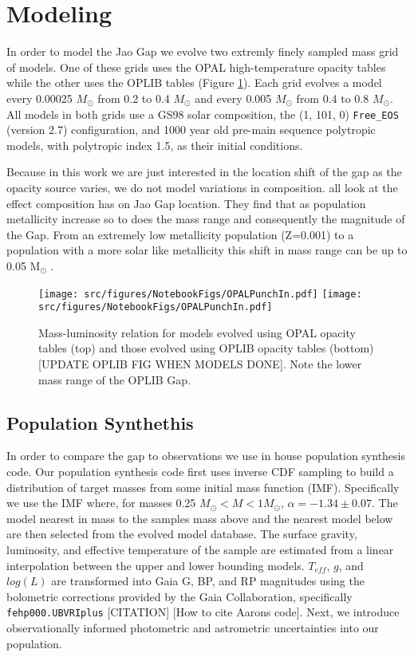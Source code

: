 \section{Modeling}\label{sec:modeling}
In order to model the Jao Gap we evolve two extremly finely sampled mass grid
of models. One of these grids uses the OPAL high-temperature opacity tables
while the other uses the OPLIB tables (Figure \ref{fig:PunchIn}). Each grid
evolves a model every 0.00025 $M_{\odot}$ from 0.2 to 0.4 $M_{\odot}$ and every
0.005 $M_{\odot}$ from 0.4 to 0.8 $M_{\odot}$. All models in both grids use a
GS98 solar composition, the (1, 101, 0) \texttt{Free\_EOS} (version
{\color{red}2.7}) configuration, and 1000 year old pre-main sequence polytropic
models, with polytropic index 1.5, as their initial conditions.

Because in this work we are just interested in the location shift of the gap as
the opacity source varies, we do not model variations in composition.
\citet{Mansfield2021,Jao2020,Feiden2021} all look at the effect composition has
on Jao Gap location. They find that as population metallicity increase so to
does the mass range and consequently the magnitude of the Gap. From an extremely
low metallicity population (Z=0.001) to a population with a more solar like
metallicity this shift in mass range can be up to 0.05 M$_{\odot}$
\citep{Mansfield2021}.

\begin{figure}
	\centering
	\texttt{[image: src/figures/NotebookFigs/OPALPunchIn.pdf]}
	\texttt{[image: src/figures/NotebookFigs/OPALPunchIn.pdf]}
	\caption{Mass-luminosity relation for models evolved using OPAL opacity
	tables (top) and those evolved using OPLIB opacity tables (bottom)
	{\color{red}[UPDATE OPLIB FIG WHEN MODELS DONE]}. Note the lower mass range
	of the OPLIB Gap.}
	\label{fig:PunchIn}
		
\end{figure}

\subsection{Population Synthethis}
In order to compare the gap to observations we use in house population
synthesis code. Our population synthesis code first uses inverse CDF sampling
to build a distribution of target masses from some initial mass function (IMF).
Specifically we use the \citet{Sollima2019} IMF where, for masses 0.25
$M_{\odot} < M < 1 M_{\odot}$, $\alpha=-1.34\pm0.07$. The model nearest in mass
to the samples mass above and the nearest model below are then selected from
the evolved model database. The surface gravity, luminosity, and effective
temperature of the sample are estimated from a linear interpolation between the
upper and lower bounding models. $T_{eff}$, $g$, and $log(L)$ are transformed
into Gaia G, BP, and RP magnitudes using the bolometric corrections provided by
the Gaia Collaboration, specifically \texttt{fehp000.UBVRIplus}
{\color{red}[CITATION]} {\color{red}[How to cite Aarons code]}. Next, we
introduce observationally informed photometric and astrometric uncertainties
into our population.

